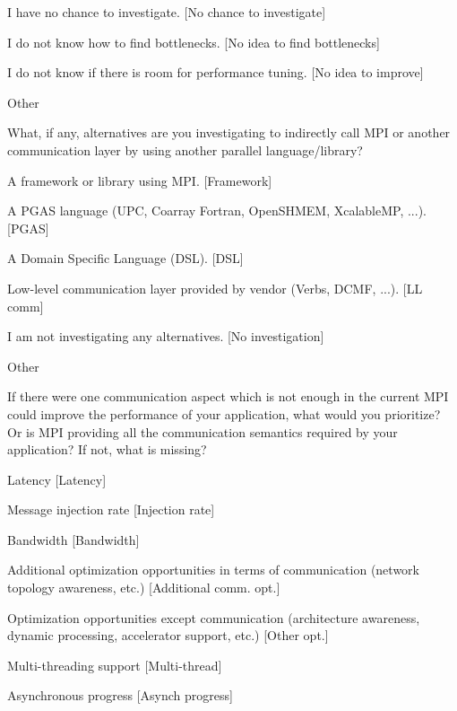 \documentclass[preprint,5p,times]{elsarticle}
\begin{document}
{{\begin{description}
\begin{inparaenum}
    \item I have no chance to investigate.
      [No chance to investigate]
    \item I do not know how to find bottlenecks.
      [No idea to find bottlenecks]
    \item I do not know if there is room for performance tuning.
      [No idea to improve]
    \item Other
    \end{inparaenum}
  \item[Q24*:] What, if any, alternatives are you investigating to
    indirectly call MPI or another communication layer by using another
    parallel language/library?
    \begin{inparaenum}[{\bf C}1)]
    \item A framework or library using MPI. [Framework]
    \item A PGAS language (UPC, Coarray Fortran, OpenSHMEM, XcalableMP,
      ...). [PGAS]
    \item A Domain Specific Language (DSL). [DSL]
    \item Low-level communication layer provided by vendor (Verbs, DCMF,
      ...). [LL comm]
    \item I am not investigating any alternatives. [No investigation]
    \item Other
    \end{inparaenum}
  \item[Q25:] If there were one communication aspect which is not enough
    in the current MPI could improve the performance of your application,
    what would you prioritize? Or is MPI providing all the communication
    semantics required by your application? If not, what is missing?
    \begin{inparaenum}[{\bf C}1)]
    \item Latency [Latency]
    \item Message injection rate [Injection rate]
    \item Bandwidth [Bandwidth]
    \item Additional optimization opportunities in terms of communication
      (network topology awareness, etc.) [Additional comm. opt.]
    \item Optimization opportunities except communication (architecture
      awareness, dynamic processing, accelerator support, etc.) [Other opt.]
    \item Multi-threading support [Multi-thread]
    \item Asynchronous progress [Asynch progress]

\end{inparaenum}
\end{description}}}
\end{document}
